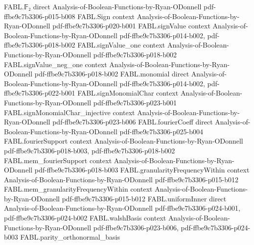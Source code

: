 \begin{theorem}
\label{FABL.isPCPP_of_exists_close_of_acceptanceProbability_ge}
\leanok
{}
\proofstep
  {FABL.𝔽₂}
  {direct}
  {Analysis-of-Boolean-Functions-by-Ryan-ODonnell}
  {pdf-ffbe9c7b3306-p015-b008}
\proofstep
  {FABL.Sign}
  {context}
  {Analysis-of-Boolean-Functions-by-Ryan-ODonnell}
  {pdf-ffbe9c7b3306-p020-b001}
\proofstep
  {FABL.signValue}
  {context}
  {Analysis-of-Boolean-Functions-by-Ryan-ODonnell}
  {pdf-ffbe9c7b3306-p014-b002,
    pdf-ffbe9c7b3306-p018-b002}
\proofstep
  {FABL.signValue_one}
  {context}
  {Analysis-of-Boolean-Functions-by-Ryan-ODonnell}
  {pdf-ffbe9c7b3306-p018-b002}
\proofstep
  {FABL.signValue_neg_one}
  {context}
  {Analysis-of-Boolean-Functions-by-Ryan-ODonnell}
  {pdf-ffbe9c7b3306-p018-b002}
\proofstep
  {FABL.monomial}
  {direct}
  {Analysis-of-Boolean-Functions-by-Ryan-ODonnell}
  {pdf-ffbe9c7b3306-p014-b002,
    pdf-ffbe9c7b3306-p022-b001}
\proofstep
  {FABL.signMonomialChar}
  {context}
  {Analysis-of-Boolean-Functions-by-Ryan-ODonnell}
  {pdf-ffbe9c7b3306-p023-b001}
\proofstep
  {FABL.signMonomialChar_injective}
  {context}
  {Analysis-of-Boolean-Functions-by-Ryan-ODonnell}
  {pdf-ffbe9c7b3306-p023-b006}
\proofstep
  {FABL.fourierCoeff}
  {direct}
  {Analysis-of-Boolean-Functions-by-Ryan-ODonnell}
  {pdf-ffbe9c7b3306-p025-b004}
\proofstep
  {FABL.fourierSupport}
  {context}
  {Analysis-of-Boolean-Functions-by-Ryan-ODonnell}
  {pdf-ffbe9c7b3306-p018-b003,
    pdf-ffbe9c7b3306-p018-b002}
\proofstep
  {FABL.mem_fourierSupport}
  {context}
  {Analysis-of-Boolean-Functions-by-Ryan-ODonnell}
  {pdf-ffbe9c7b3306-p018-b003}
\proofstep
  {FABL.granularityFrequencyWithin}
  {context}
  {Analysis-of-Boolean-Functions-by-Ryan-ODonnell}
  {pdf-ffbe9c7b3306-p015-b012}
\proofstep
  {FABL.mem_granularityFrequencyWithin}
  {context}
  {Analysis-of-Boolean-Functions-by-Ryan-ODonnell}
  {pdf-ffbe9c7b3306-p015-b012}
\proofstep
  {FABL.uniformInner}
  {direct}
  {Analysis-of-Boolean-Functions-by-Ryan-ODonnell}
  {pdf-ffbe9c7b3306-p024-b001,
    pdf-ffbe9c7b3306-p024-b002}
\proofstep
  {FABL.walshBasis}
  {context}
  {Analysis-of-Boolean-Functions-by-Ryan-ODonnell}
  {pdf-ffbe9c7b3306-p023-b006,
    pdf-ffbe9c7b3306-p024-b003}
\proofstep
  {FABL.parity_orthonormal_basis}

\end{theorem}
